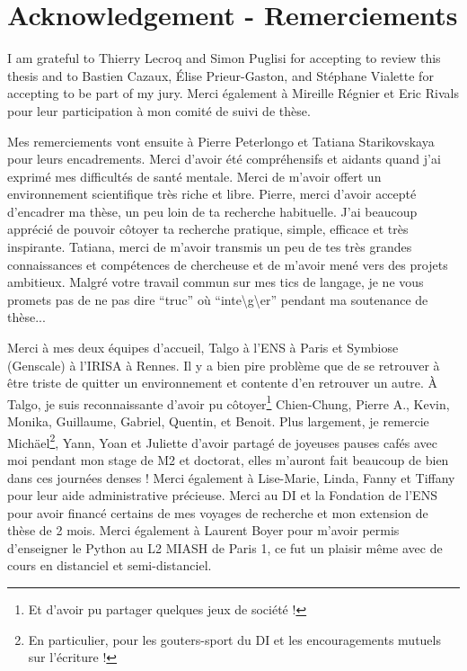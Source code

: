 \chapter*{Acknowledgement - Remerciements}
\thispagestyle{empty}

I am grateful to Thierry Lecroq and Simon Puglisi for accepting to review this thesis and to Bastien Cazaux, Élise Prieur-Gaston, and Stéphane Vialette for accepting to be part of my jury. Merci également à Mireille Régnier et Eric Rivals pour leur participation à mon comité de suivi de thèse.


Mes remerciements vont ensuite à Pierre Peterlongo et Tatiana Starikovskaya pour leurs encadrements. Merci d’avoir été compréhensifs et aidants quand j’ai exprimé mes difficultés de santé mentale. Merci de m’avoir offert un environnement scientifique très riche et libre.
Pierre, merci d’avoir accepté d’encadrer ma thèse, un peu loin de ta recherche habituelle. J’ai beaucoup apprécié de pouvoir côtoyer ta recherche pratique, simple, efficace et très inspirante.
Tatiana, merci de m’avoir transmis un peu de tes très grandes connaissances et compétences de chercheuse et de m’avoir mené vers des projets ambitieux.
Malgré votre travail commun sur mes tics de langage, je ne vous promets pas de ne pas dire ``truc'' où ``inte\textbackslash g\textbackslash er'' pendant ma soutenance de thèse...


Merci à mes deux équipes d’accueil, Talgo à l’ENS à Paris et Symbiose (Genscale) à l’IRISA à Rennes. Il y a bien pire problème que de se retrouver à être triste de quitter un environnement et contente d’en retrouver un autre.
À Talgo, je suis reconnaissante d’avoir pu côtoyer\footnote{Et d'avoir pu partager quelques jeux de société !} Chien-Chung, Pierre A., Kevin, Monika, Guillaume, Gabriel, Quentin, et Benoit.
Plus largement, je remercie Michäel\footnote{En particulier, pour les gouters-sport du DI et les encouragements mutuels sur l'écriture !}, Yann, Yoan et Juliette d’avoir partagé de joyeuses pauses cafés avec moi pendant mon stage de M2 et doctorat, elles m’auront fait beaucoup de bien dans ces journées denses !
Merci également à Lise-Marie, Linda, Fanny et Tiffany pour leur aide administrative précieuse. Merci au DI et la Fondation de l’ENS pour avoir financé certains de mes voyages de recherche et mon extension de thèse de 2 mois.
Merci également à Laurent Boyer pour m’avoir permis d’enseigner le Python au L2 MIASH de Paris 1, ce fut un plaisir même avec de cours en distanciel et semi-distanciel.


